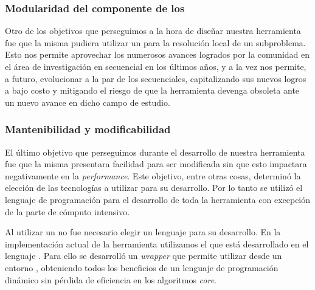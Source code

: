 %

\subsubsection{Modularidad del componente \ssolver de los \ws}

Otro de los objetivos que perseguimos a la hora de diseñar nuestra herramienta
fue que la misma pudiera utilizar un \ssolver \ots para la resolución local de
un subproblema. Esto nos permite aprovechar los numerosos avances logrados por
la comunidad en el área de investigación en \ssolving secuencial en los últimos
años, y a la vez nos permite, a futuro, evolucionar a la par de los \ssolvers
secuenciales, capitalizando sus nuevos logros a bajo costo y mitigando el
riesgo de que la herramienta devenga obsoleta ante un nuevo avance en dicho
campo de estudio.

\subsubsection{Mantenibilidad y modificabilidad}

El último objetivo que perseguimos durante el desarrollo de nuestra
herramienta fue que la misma presentara facilidad para ser modificada sin que
esto impactara negativamente en la \emph{performance}. Este objetivo, entre
otras cosas, determinó la elección de las tecnologías a utilizar para su
desarrollo. Por lo tanto se utilizó el lenguaje de programación \Python para
el desarrollo de toda la herramienta con excepción de la parte de cómputo
intensivo.

Al utilizar un \ssolver \ots no fue necesario elegir un lenguaje
para su desarrollo. En la implementación actual de la herramienta utilizamos
el \ssolver \minisatdosveinte que está desarrollado en el lenguaje \cpp. Para
ello se desarrolló un \emph{wrapper} que permite utilizar \minisat desde un
entorno \Python, obteniendo todos los beneficios de un lenguaje de programación
dinámico sin pérdida de eficiencia en los algoritmos \emph{core}.

